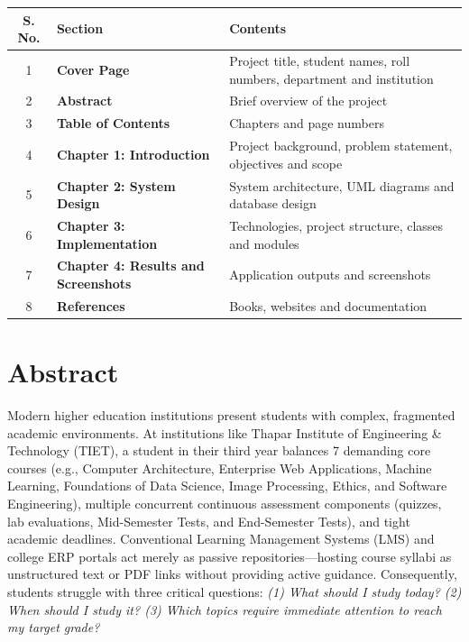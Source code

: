 \documentclass[12pt,a4paper]{report}
\begin{document}
\vspace{0.3cm}
\begin{table}[h!]
\centering
\begin{tabularx}{\textwidth}{|c|X|X|}
\hline
\rowcolor{CodeBorder}
\textbf{S. No.} & \textbf{Section} & \textbf{Contents} \\ \hline
1 & \textbf{Cover Page} & Project title, student names, roll numbers, department and institution \\ \hline
2 & \textbf{Abstract} & Brief overview of the project \\ \hline
3 & \textbf{Table of Contents} & Chapters and page numbers \\ \hline
4 & \textbf{Chapter 1: Introduction} & Project background, problem statement, objectives and scope \\ \hline
5 & \textbf{Chapter 2: System Design} & System architecture, UML diagrams and database design \\ \hline
6 & \textbf{Chapter 3: Implementation} & Technologies, project structure, classes and modules \\ \hline
7 & \textbf{Chapter 4: Results and Screenshots} & Application outputs and screenshots \\ \hline
8 & \textbf{References} & Books, websites and documentation \\ \hline
\end{tabularx}
\end{table}

\vspace{0.4cm}
\section*{\color{ThaparCrimson} Abstract}

Modern higher education institutions present students with complex, fragmented academic environments. At institutions like Thapar Institute of Engineering \& Technology (TIET), a student in their third year balances 7 demanding core courses (e.g., Computer Architecture, Enterprise Web Applications, Machine Learning, Foundations of Data Science, Image Processing, Ethics, and Software Engineering), multiple concurrent continuous assessment components (quizzes, lab evaluations, Mid-Semester Tests, and End-Semester Tests), and tight academic deadlines. Conventional Learning Management Systems (LMS) and college ERP portals act merely as passive repositories—hosting course syllabi as unstructured text or PDF links without providing active guidance. Consequently, students struggle with three critical questions: \textit{(1) What should I study today? (2) When should I study it? (3) Which topics require immediate attention to reach my target grade?}
\end{document}
